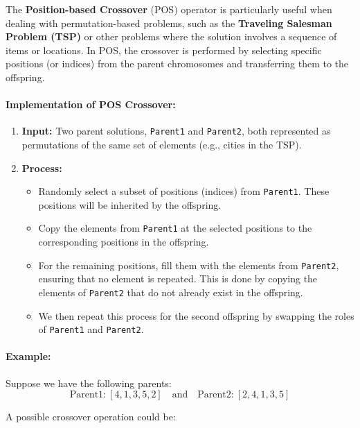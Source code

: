 \documentclass[11pt]{article}
\begin{document}
The \textbf{Position-based Crossover} (POS) operator is particularly useful when dealing with permutation-based problems, such as the \textbf{Traveling Salesman Problem (TSP)} or other problems where the solution involves a sequence of items or locations. In POS, the crossover is performed by selecting specific positions (or indices) from the parent chromosomes and transferring them to the offspring.

\paragraph{Implementation of POS Crossover:}

\begin{enumerate}
    \item \textbf{Input:} Two parent solutions, \texttt{Parent1} and \texttt{Parent2}, both represented as permutations of the same set of elements (e.g., cities in the TSP).
    \item \textbf{Process:}
    \begin{itemize}
        \item Randomly select a subset of positions (indices) from \texttt{Parent1}. These positions will be inherited by the offspring.
        \item Copy the elements from \texttt{Parent1} at the selected positions to the corresponding positions in the offspring.
        \item For the remaining positions, fill them with the elements from \texttt{Parent2}, ensuring that no element is repeated. This is done by copying the elements of \texttt{Parent2} that do not already exist in the offspring.
        \item We then repeat this process for the second offspring by swapping the roles of \texttt{Parent1} and \texttt{Parent2}.
    \end{itemize}
\end{enumerate}

\paragraph{Example:}

Suppose we have the following parents:
\[
\text{Parent1:} \ [4, 1, 3, 5, 2]
\quad \text{and} \quad \text{Parent2:} \ [2, 4, 1, 3, 5]
\]

A possible crossover operation could be:
\end{document}
